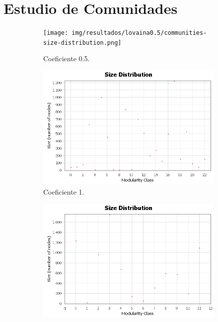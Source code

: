\section{Estudio de Comunidades}

\begin{figure}
    \centering  
    \begin{subfigure}[t]{0.48\textwidth}
      \centering
      \texttt{[image: img/resultados/lovaina0.5/communities-size-distribution.png]}
      \caption{Coeficiente 0.5.}
    \end{subfigure}
    \vspace{7mm}
    \hfill
    \begin{subfigure}[t]{0.48\textwidth}
      \centering
      \includegraphics[width=\textwidth]{img/resultados/lovaina1/communities-size-distribution.png}
      \caption{Coeficiente 1.}
    \end{subfigure}
    \hfill
    \begin{subfigure}[t]{0.48\textwidth}
      \centering
      \includegraphics[width=\textwidth]{img/resultados/lovaina2/communities-size-distribution.png}

\end{subfigure}
\end{figure}
